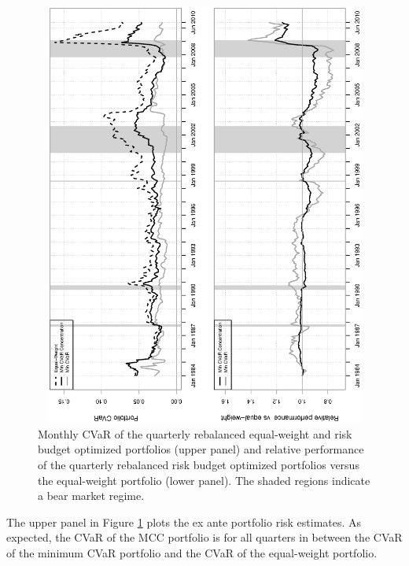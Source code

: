 \documentclass[12pt,a4paper]{article}
\begin{document}
\begin{figure}[h]
\begin{center}
\caption{Monthly CVaR of the quarterly rebalanced equal-weight and risk budget optimized portfolios (upper panel) and relative performance of the quarterly rebalanced risk budget optimized portfolios versus the equal-weight portfolio (lower panel). The shaded regions indicate a bear market regime. \label{fig:relperformance}  }
\includegraphics[width=12cm,height=14cm,angle=270]{portfolioCVaRRelPerf_CC.eps}
\end{center}
\end{figure}


The upper panel in Figure \ref{fig:relperformance} plots the ex ante portfolio risk estimates. As expected, the CVaR of the MCC portfolio is for all quarters in between the CVaR of the minimum CVaR portfolio and the CVaR of the equal-weight portfolio.
\end{document}
